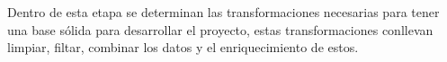 Dentro de esta etapa se determinan las transformaciones necesarias para tener una base sólida para desarrollar el proyecto, estas transformaciones conllevan limpiar, filtar, combinar los datos y el enriquecimiento de estos. 
